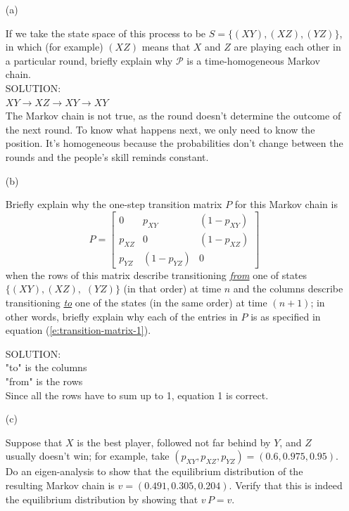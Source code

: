 \documentclass[12pt]{article}
\begin{document}
\begin{itemize}

\item[(a)]

If we take the state space of this process to be $S = \{ ( X Y ), ( X Z ), ( Y Z ) \}$, in which (for example) $( X Z )$ means that $X$ and $Z$ are playing each other in a particular round, briefly explain why $\mathcal{ P }$ is a time-homogeneous Markov chain. \fbox{\textit{[5 points]}}\\

SOLUTION: \\
$XY \rightarrow XZ \rightarrow XY \rightarrow XY$ \, \\
The Markov chain is not true, as the round doesn't determine the outcome of the next round. To know what happens next, we only need to know the position. It's homogeneous because the probabilities don't change between the rounds and the people's skill reminds constant. \\

\item[(b)]

Briefly explain why the one-step transition matrix $P$ for this Markov chain is
\begin{equation} \label{e:transition-matrix-1}
P = \left[ \begin{array}{ccc} 
0 & p_{ X Y } & ( 1 - p_{ X Y } ) \\
p_{ X Z } & 0 & ( 1 - p_{ X Z } ) \\
p_{ Y Z } & ( 1 - p_{ Y Z } ) & 0
\end{array} 
\right]
\end{equation}
when the rows of this matrix describe transitioning \underline{\textit{from}} one of states $\{ ( X Y ), ( X Z ),$ $( Y Z ) \}$ (in that order) at time $n$ and the columns describe transitioning \underline{\textit{to}} one of the states (in the same order) at time $( n + 1 )$; in other words, briefly explain why each of the entries in $P$ is as specified in equation (\ref{e:transition-matrix-1}). \fbox{\textit{[10 points]}}

SOLUTION: \\

"to" is the columns \\
"from" is the rows \\
Since all the rows have to sum up to 1, equation 1 is correct. 

\item[(c)]

Suppose that $X$ is the best player, followed not far behind by $Y$, and $Z$ usually doesn't win; for example, take $( p_{ XY }, p_{ XZ }, p_{ YZ } ) = ( 0.6, 0.975, 0.95 )$. Do an eigen-analysis to show that the equilibrium distribution of the resulting Markov chain is $v = ( 0.491, 0.305, 0.204 )$. Verify that this is indeed the equilibrium distribution by showing that $v \, P = v$. \fbox{\textit{[10 points]}}


\end{itemize}
\end{document}
